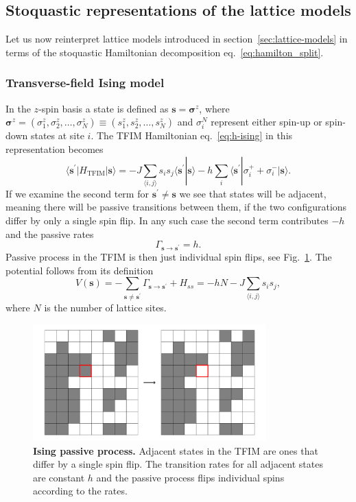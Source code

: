 \subsection{Stoquastic representations of the lattice models}
\label{subsec:stoq_latt_forms}
Let us now reinterpret lattice models introduced in section~\ref{sec:lattice-models} in terms of the stoquastic Hamiltonian decomposition eq.~\eqref{eq:hamilton_split}.

\subsubsection{Transverse-field Ising model}
\label{subsubsec:res-im}
In the $z$-spin basis a state is defined as $\mathbf{s} = \boldsymbol{\sigma}^z$, where $\boldsymbol{\sigma}^z = (\sigma_1^z, \sigma_2^z, \ldots, \sigma_N^z) \equiv (s_1^z, s_2^z, \ldots, s_N^z)$ and $\sigma_i^N$ represent either spin-up or spin-down states at site $i$. The TFIM Hamiltonian eq.~\eqref{eq:h-ising} in this representation becomes
\begin{equation}
	\langle \mathbf{s}^\prime | H_{\text{TFIM}} | \mathbf{s}\rangle = -J \sum_{\langle i, j \rangle} s_i s_j \langle \mathbf{s}^\prime | \mathbf{s}\rangle -h \sum_i \langle \mathbf{s}^\prime | \sigma_{i}^+ + \sigma_{i}^- | \mathbf{s} \rangle.
\end{equation}
If we examine the second term for $\mathbf{s}^\prime \neq \mathbf{s}$ we see that states will be adjacent, meaning there will be passive transitions between them, if the two configurations differ by only a single spin flip. In any such case the second term contributes $-h$ and the passive rates 
\begin{equation}
	\Gamma_{\mathbf{s}\rightarrow\mathbf{s}^\prime} = h.
\end{equation}
Passive process in the TFIM is then just individual spin flips, see Fig.~\ref{fig:isingpassive}. The potential follows from its definition
\begin{equation}
	V(\mathbf{s}) = -\sum_{\mathbf{s} \neq \mathbf{s}^\prime} \Gamma_{\mathbf{s}\rightarrow\mathbf{s}^\prime} + H_{ss} = -hN - J\sum_{\langle i, j \rangle} s_i s_j,
\end{equation}
where $N$ is the number of lattice sites.
\begin{figure}[h]
	\centering
	\includegraphics[height=4.5cm]{Chapter5/Figs/Vector/ising_passive}
	\caption[Ising passive process]{\textbf{Ising passive process.} Adjacent states in the TFIM are ones that differ by a single spin flip. The transition rates for all adjacent states are constant $h$ and the passive process flips individual spins according to the rates.}	
	\label{fig:isingpassive}
\end{figure}
